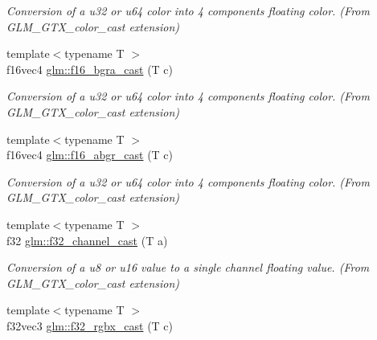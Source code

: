 \begin{DoxyCompactItemize}
\begin{DoxyCompactList}\small\item\em Conversion of a u32 or u64 color into 4 components floating color. (From G\+L\+M\+\_\+\+G\+T\+X\+\_\+color\+\_\+cast extension) \end{DoxyCompactList}\item 
\hypertarget{group__gtx__color__cast_ga1367757d9f9f63837ec7f286211bfe93}{}{\footnotesize template$<$typename T $>$ }\\f16vec4 \hyperlink{group__gtx__color__cast_ga1367757d9f9f63837ec7f286211bfe93}{glm\+::f16\+\_\+bgra\+\_\+cast} (T c)\label{group__gtx__color__cast_ga1367757d9f9f63837ec7f286211bfe93}

\begin{DoxyCompactList}\small\item\em Conversion of a u32 or u64 color into 4 components floating color. (From G\+L\+M\+\_\+\+G\+T\+X\+\_\+color\+\_\+cast extension) \end{DoxyCompactList}\item 
\hypertarget{group__gtx__color__cast_ga1c37ab880548dafc96d9d722cd8340aa}{}{\footnotesize template$<$typename T $>$ }\\f16vec4 \hyperlink{group__gtx__color__cast_ga1c37ab880548dafc96d9d722cd8340aa}{glm\+::f16\+\_\+abgr\+\_\+cast} (T c)\label{group__gtx__color__cast_ga1c37ab880548dafc96d9d722cd8340aa}

\begin{DoxyCompactList}\small\item\em Conversion of a u32 or u64 color into 4 components floating color. (From G\+L\+M\+\_\+\+G\+T\+X\+\_\+color\+\_\+cast extension) \end{DoxyCompactList}\item 
\hypertarget{group__gtx__color__cast_ga450fce811cc485d4e5fbe915cdbb995f}{}{\footnotesize template$<$typename T $>$ }\\f32 \hyperlink{group__gtx__color__cast_ga450fce811cc485d4e5fbe915cdbb995f}{glm\+::f32\+\_\+channel\+\_\+cast} (T a)\label{group__gtx__color__cast_ga450fce811cc485d4e5fbe915cdbb995f}

\begin{DoxyCompactList}\small\item\em Conversion of a u8 or u16 value to a single channel floating value. (From G\+L\+M\+\_\+\+G\+T\+X\+\_\+color\+\_\+cast extension) \end{DoxyCompactList}\item 
\hypertarget{group__gtx__color__cast_gaf3bdd33a9a652a8f398f3c22e12d808c}{}{\footnotesize template$<$typename T $>$ }\\f32vec3 \hyperlink{group__gtx__color__cast_gaf3bdd33a9a652a8f398f3c22e12d808c}{glm\+::f32\+\_\+rgbx\+\_\+cast} (T c)\label{group__gtx__color__cast_gaf3bdd33a9a652a8f398f3c22e12d808c}


\end{DoxyCompactItemize}
